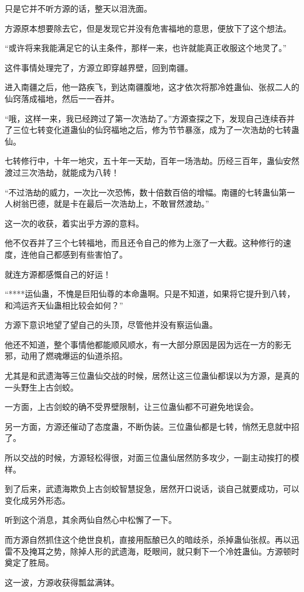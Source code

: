 \begin{this_body}
只是它并不听方源的话，整天以泪洗面。

方源原本想要除去它，但是发现它并没有危害福地的意思，便放下了这个想法。

“或许将来我能满足它的认主条件，那样一来，也许就能真正收服这个地灵了。”

这件事情处理完了，方源立即穿越界壁，回到南疆。

进入南疆之后，他一路疾飞，到达南疆腹地，这才依次将那冷姓蛊仙、张叔二人的仙窍落成福地，然后一一吞并。

“哦，这样一来，我已经跨过了第一次浩劫了。”方源查探之下，发现自己连续吞并了三位七转变化道蛊仙的仙窍福地之后，修为节节暴涨，成为了一次浩劫的七转蛊仙。

七转修行中，十年一地灾，五十年一天劫，百年一场浩劫。历经三百年，蛊仙安然渡过三次浩劫，就能成为八转！

“不过浩劫的威力，一次比一次恐怖，数十倍数百倍的增幅。南疆的七转蛊仙第一人树翁巴德，就是卡在最后一次浩劫上，不敢冒然渡劫。”

这一次的收获，着实出乎方源的意料。

他不仅吞并了三个七转福地，而且还令自己的修为上涨了一大截。这种修行的速度，连他自己都感到有些害怕了。

就连方源都感慨自己的好运！

“****运仙蛊，不愧是巨阳仙尊的本命蛊啊。只是不知道，如果将它提升到八转，和鸿运齐天仙蛊相比较会如何？”

方源下意识地望了望自己的头顶，尽管他并没有察运仙蛊。

他还不知道，整个事情他都能顺风顺水，有一大部分原因是因为远在一方的影无邪，动用了燃魂爆运的仙道杀招。

尤其是和武遗海等三位蛊仙交战的时候，居然让这三位蛊仙都误以为方源，是真的一头野生上古剑蛟。

一方面，上古剑蛟的确不受界壁限制，让三位蛊仙都不可避免地误会。

另一方面，方源还催动了态度蛊，不断伪装。三位蛊仙都是七转，悄然无息就中招了。

所以交战的时候，方源轻松得很，对面三位蛊仙居然防多攻少，一副主动挨打的模样。

到了后来，武遗海欺负上古剑蛟智慧捉急，居然开口说话，谈自己就要成功，可以变化成另外形态。

听到这个消息，其余两仙自然心中松懈了一下。

而方源自然抓住这个绝世良机，直接用酝酿已久的暗歧杀，杀掉蛊仙张叔。再以迅雷不及掩耳之势，除掉人形的武遗海，眨眼间，就只剩下一个冷姓蛊仙。方源顿时奠定了胜局。

这一波，方源收获得瓢盆满钵。


\end{this_body}
